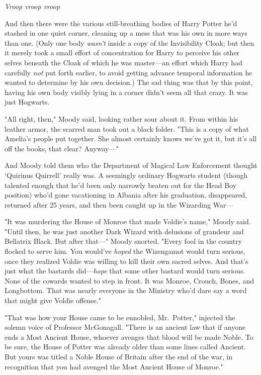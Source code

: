 \emph{Vroop{\el} vroop{\el} vroop}{\el}

And then there were the various still-breathing bodies of Harry Potter he'd
stashed in one quiet corner, cleaning up a mess that was his own in more ways
than one. (Only one body \emph{wasn't} inside a copy of the Invisibility Cloak;
but then it merely took a small effort of concentration for Harry to perceive
his other selves beneath the Cloak of which he was master—an effort which
Harry had carefully \emph{not} put forth earlier, to avoid getting advance
temporal information he wanted to determine by his own decision.) The sad thing
was that by this point, having his own body visibly lying in a corner didn't
seem all that crazy. It was just{\el} Hogwarts.

"All right, then," Moody said, looking rather sour about it. From within his
leather armor, the scarred man took out a black folder. "This is a copy of what
Amelia's people put together. She almost certainly knows we've got it, but it's
all off the books, that clear? Anyway—"

And Moody told them who the Department of Magical Law Enforcement thought
`Quirinus Quirrell' really was. A seemingly ordinary Hogwarts student (though
talented enough that he'd been only narrowly beaten out for the Head Boy
position) who'd gone vacationing in Albania after his graduation, disappeared,
returned after 25 years, and then been caught up in the Wizarding War—

"It was murdering the House of Monroe that made Voldie's name," Moody said.
"Until then, he was just another Dark Wizard with delusions of grandeur and
Bellatrix Black. But after that—" Moody snorted. "Every fool in the country
flocked to serve him. You would've \emph{hoped} the Wizengamot would turn
serious, once they realized Voldie was willing to kill their own sacred selves.
And that's just what the bastards did—\emph{hope} that some other bastard
would turn serious. None of the cowards wanted to step in front. It was Monroe,
Crouch, Bones, and Longbottom. That was nearly everyone in the Ministry who'd
dare say a word that might give Voldie offense."

"That was how your House came to be ennobled, Mr.~Potter," injected the solemn
voice of Professor McGonagall. "There is an ancient law that if anyone ends a
Most Ancient House, whoever avenges that blood will be made Noble. To be sure,
the House of Potter was already older than some lines called Ancient. But yours
was titled a Noble House of Britain after the end of the war, in recognition
that you had avenged the Most Ancient House of Monroe."

